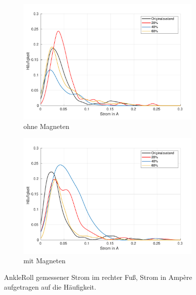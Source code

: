 \begin{figure}[tb]
	\centering
	\begin{subfigure}[c]{.9\linewidth}
		\centering
		\includegraphics[width=\linewidth]{Bilder/rechts_Current_AnkleRoll_ohneM.pdf}
		\caption{ohne Magneten}
	\end{subfigure}
	\hfill
	\begin{subfigure}[c]{.9\linewidth}
		\centering
		\includegraphics[width=\linewidth]{Bilder/rechts_Current_AnkleRoll_mitM.pdf}
		\caption{mit Magneten}
	\end{subfigure}
	\caption{AnkleRoll gemessener Strom im rechter Fuß, Strom in Ampère aufgetragen auf die Häufigkeit.} \label{AnkleRoll_Current_rechts}
\end{figure}
